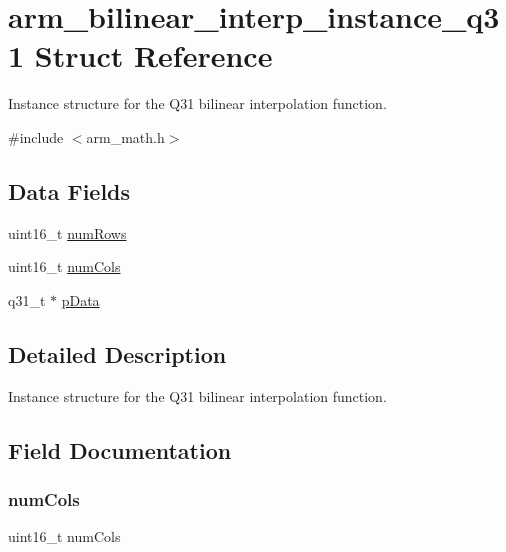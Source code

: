 \hypertarget{structarm__bilinear__interp__instance__q31}{}\section{arm\+\_\+bilinear\+\_\+interp\+\_\+instance\+\_\+q31 Struct Reference}
\label{structarm__bilinear__interp__instance__q31}


Instance structure for the Q31 bilinear interpolation function.  




{\ttfamily \#include $<$arm\+\_\+math.\+h$>$}

\subsection*{Data Fields}
\begin{DoxyCompactItemize}
\item 
uint16\+\_\+t \mbox{\hyperlink{structarm__bilinear__interp__instance__q31_a1bcf80ccdc2acc29198f1592ae300390}{num\+Rows}}
\item 
uint16\+\_\+t \mbox{\hyperlink{structarm__bilinear__interp__instance__q31_a4bb5ec0d13eb4c9cf887aa8366a44117}{num\+Cols}}
\item 
q31\+\_\+t $\ast$ \mbox{\hyperlink{structarm__bilinear__interp__instance__q31_ad296f76577326ff280726323536eed6d}{p\+Data}}
\end{DoxyCompactItemize}


\subsection{Detailed Description}
Instance structure for the Q31 bilinear interpolation function. 

\subsection{Field Documentation}
\mbox{\label{structarm__bilinear__interp__instance__q31_a4bb5ec0d13eb4c9cf887aa8366a44117}} 
\subsubsection{\texorpdfstring{numCols}{numCols}}
{\footnotesize\ttfamily uint16\+\_\+t num\+Cols}

